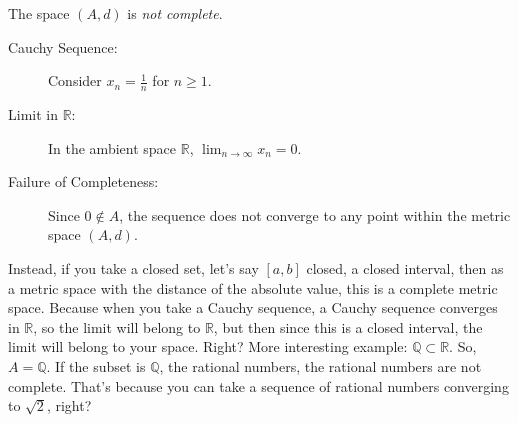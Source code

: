 \begin{math-stroke}
The space $(A, d)$ is \emph{not complete}.
\begin{description}
    \item[Cauchy Sequence:] Consider $x_n = \frac{1}{n}$ for $n \ge 1$.
    \item[Limit in $\mathbb{R}$:] In the ambient space $\mathbb{R}$, $\lim_{n \to \infty} x_n = 0$.
    \item[Failure of Completeness:] Since $0 \notin A$, the sequence does not converge to any point within the metric space $(A, d)$.
\end{description}
\end{math-stroke}


\begin{spoken-clean}[00:06:15 - 00:07:34]
Instead, if you take a closed set, let's say $[a, b]$ closed, a closed interval, then as a metric space with the distance of the absolute value, this is a complete metric space. Because when you take a Cauchy sequence, a Cauchy sequence converges in $\mathbb{R}$, so the limit will belong to $\mathbb{R}$, but then since this is a closed interval, the limit will belong to your space. Right? More interesting example: $\mathbb{Q} \subset \mathbb{R}$. So, $A = \mathbb{Q}$. If the subset is $\mathbb{Q}$, the rational numbers, the rational numbers are not complete. That's because you can take a sequence of rational numbers converging to $\sqrt{2}$, right?
\end{spoken-clean}


